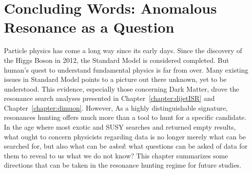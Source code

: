 \chapter{Concluding Words: Anomalous Resonance as a Question}




Particle physics has come a long way since its early days. Since the discovery of the Higgs Boson in 2012, the Standard Model is considered completed. But human's quest to understand fundamental physics is far from over. Many existing issues in Standard Model points to a picture out there unknown, yet to be understood. This evidence, especially those concerning Dark Matter, drove the resonance search analyses presented in Chapter~\ref{chapter:dijetISR} and Chapter~\ref{chapter:dimuon}.
However, As a highly distinguishable signature, resonances hunting offers much more than a tool to hunt for a specific candidate. In the age where most exotic and SUSY searches and returned empty results, what ought to concern physicists regarding data is no longer merely what can be searched for, but also what can be \textit{asked}: what questions can be asked of data for them to reveal to us what we do not know? This chapter summarizes some directions that can be taken in the resonance hunting regime for future studies.


